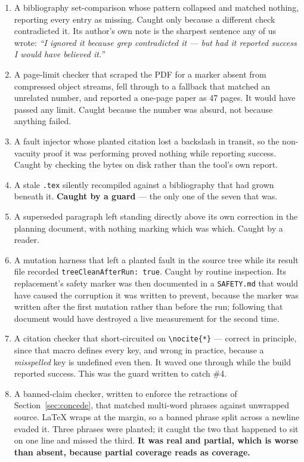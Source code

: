 \documentclass[10pt,journal,compsoc]{IEEEtran}
\begin{document}
\begin{enumerate}
\item A bibliography set-comparison whose pattern collapsed and matched nothing,
  reporting every entry as missing. Caught only because a different check contradicted
  it. Its author's own note is the sharpest sentence any of us wrote: \emph{``I ignored
  it because grep contradicted it --- but had it reported success I would have believed
  it.''}
\item A page-limit checker that scraped the PDF for a marker absent from compressed
  object streams, fell through to a fallback that matched an unrelated number, and
  reported a one-page paper as 47 pages. It would have passed any limit. Caught because
  the number was absurd, not because anything failed.
\item A fault injector whose planted citation lost a backslash in transit, so the
  non-vacuity proof it was performing proved nothing while reporting success. Caught by
  checking the bytes on disk rather than the tool's own report.
\item A stale \texttt{.tex} silently recompiled against a bibliography that had grown
  beneath it. \textbf{Caught by a guard} --- the only one of the seven that was.
\item A superseded paragraph left standing directly above its own correction in the
  planning document, with nothing marking which was which. Caught by a reader.
\item A mutation harness that left a planted fault in the source tree while its result
  file recorded \texttt{treeCleanAfterRun: true}. Caught by routine inspection. Its
  replacement's safety marker was then documented in a \texttt{SAFETY.md} that would
  have caused the corruption it was written to prevent, because the marker was written
  after the first mutation rather than before the run; following that document would
  have destroyed a live measurement for the second time.
\item A citation checker that short-circuited on \texttt{\textbackslash nocite\{*\}} ---
  correct in principle, since that macro defines every key, and wrong in practice,
  because a \emph{misspelled} key is undefined even then. It waved one through while the
  build reported success. This was the guard written to catch \#4.
\item A banned-claim checker, written to enforce the retractions of
  Section~\ref{sec:concede}, that matched multi-word phrases against unwrapped source.
  \LaTeX{} wraps at the margin, so a banned phrase split across a newline evaded it. Three
  phrases were planted; it caught the two that happened to sit on one line and missed the
  third. \textbf{It was real and partial, which is worse than absent, because partial
  coverage reads as coverage.}
\end{enumerate}
\end{document}

